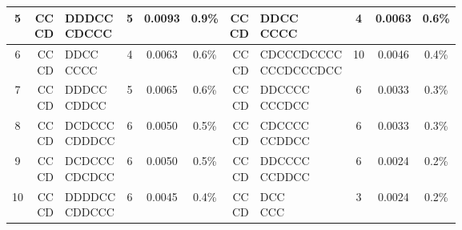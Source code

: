 \documentclass[11pt]{article}
\theoremstyle{plainCl1}
\theoremstyle{plainCl2}
\begin{document}
\begin{table}
{\begin{tabular}{c|rlccc|rlccc}
    5  &  \cellcolor{gray!25} \makecell[r]{CC \\ CD} & \makecell[l]{  DDDCC \\    CDCCC} &  5 &  0.0093 & 0.9\%  &   \cellcolor{gray!25} \makecell[r]{CC \\ CD} & \makecell[l]{         DDCC \\          CCCC} &   4 &   0.0063 & 0.6\% \\ \hline
    6  &  \cellcolor{gray!25} \makecell[r]{CC \\ CD} & \makecell[l]{   DDCC \\     CCCC} &  4 &  0.0063 & 0.6\%  &   \cellcolor{gray!25} \makecell[r]{CC \\ CD} & \makecell[l]{   CDCCCDCCCC \\    CCCDCCCDCC} &  10 &   0.0046 & 0.4\% \\ \hline
    7  &  \cellcolor{gray!25} \makecell[r]{CC \\ CD} & \makecell[l]{  DDDCC \\    CDDCC} &  5 &  0.0065 & 0.6\%  &   \cellcolor{gray!25} \makecell[r]{CC \\ CD} & \makecell[l]{       DDCCCC \\        CCCDCC} &   6 &   0.0033 & 0.3\% \\ \hline
    8  &  \cellcolor{gray!25} \makecell[r]{CC \\ CD} & \makecell[l]{ DCDCCC \\   CDDDCC} &  6 &  0.0050 & 0.5\%  &   \cellcolor{gray!25} \makecell[r]{CC \\ CD} & \makecell[l]{       CDCCCC \\        CCDDCC} &   6 &   0.0033 & 0.3\% \\ \hline
    9  &  \cellcolor{gray!25} \makecell[r]{CC \\ CD} & \makecell[l]{ DCDCCC \\   CDCDCC} &  6 &  0.0050 & 0.5\%  &   \cellcolor{gray!25} \makecell[r]{CC \\ CD} & \makecell[l]{       DDCCCC \\        CCDDCC} &   6 &   0.0024 & 0.2\% \\ \hline
    10 &  \cellcolor{gray!25} \makecell[r]{CC \\ CD} & \makecell[l]{ DDDDCC \\   CDDCCC} &  6 &  0.0045 & 0.4\%  &   \cellcolor{gray!25} \makecell[r]{CC \\ CD} & \makecell[l]{          DCC \\           CCC} &   3 &   0.0024 & 0.2\% \\ \hline

\end{tabular}}
\end{table}
\end{document}
